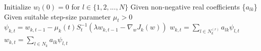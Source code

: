 \begin{algorithm}
	\caption{ The algorithm of proposed approach}\label{Alg_Proposed}
	\begin{algorithmic}[1]
		\State Initialize $ w_{l}(0)=0$ for $l\in\{1,2,...,N\}$
		\State Given non-negative real coefficients \{$a_{lk}$\}
		\State Given suitable step-size parameter $\mu_t>0$
		\State $\psi_{k,t}=w_{k,t-1}-\mu_k(t) S_t^{-1}(\lambda w_{k,t-1}-\nabla_{w}{J_k(w)})$
		\EndFor
		\State $w_{k,t}=\sum_{l\in N_k^{(r)}} a_{lk} \psi_{l,t}$
		\Else
		\State $w_{k,t}=\sum_{l\in N_k} a_{lk} \psi_{l,t}$
		\EndIf
		\EndFor
		\EndFor
		\EndFor
	\end{algorithmic}
\end{algorithm}